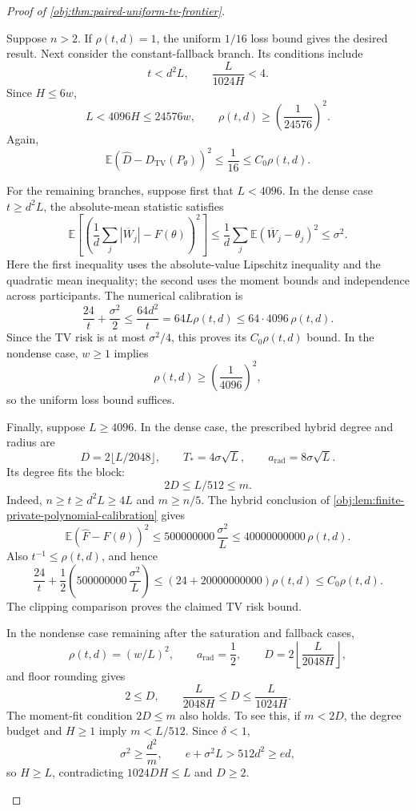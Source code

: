 \documentclass[11pt]{article}
\begin{document}
\begin{proof}[Proof of \cref{obj:thm:paired-uniform-tv-frontier}]
\begin{enumerate}
Suppose \(n>2\). If \(\rho(t,d)=1\), the uniform \(1/16\) loss bound gives the desired result.
Next consider the constant-fallback branch. Its conditions include
\[
t<d^2L,\qquad \frac{L}{1024H}<4.
\]
Since \(H\le6w\),
\[
L<4096H\le24576w,
\qquad
\rho(t,d)\ge\left(\frac1{24576}\right)^2.
\]
Again,
\[
\mathbb E(\widehat D-D_{\mathrm{TV}}(P_\theta))^2
\le\frac1{16}\le C_0\rho(t,d).
\]

For the remaining branches, suppose first that \(L<4096\).
In the dense case \(t\ge d^2L\), the absolute-mean statistic satisfies
\[
\mathbb E\left[
\left(\frac1d\sum_j|\overline W_j|-F(\theta)\right)^2
\right]
\le\frac1d\sum_j\mathbb E(\overline W_j-\theta_j)^2
\le\sigma^2.
\]
Here the first inequality uses the absolute-value Lipschitz inequality and the quadratic mean inequality; the second uses the moment bounds and independence across participants. The numerical calibration is
\[
\frac{24}{t}+\frac{\sigma^2}{2}
\le\frac{64d^2}{t}
=64L\rho(t,d)
\le64\cdot4096\,\rho(t,d).
\]
Since the TV risk is at most \(\sigma^2/4\), this proves its \(C_0\rho(t,d)\) bound.
In the nondense case, \(w\ge1\) implies
\[
\rho(t,d)\ge\left(\frac1{4096}\right)^2,
\]
so the uniform loss bound suffices.

Finally, suppose \(L\ge4096\).
In the dense case, the prescribed hybrid degree and radius are
\[
D=2\lfloor L/2048\rfloor,\qquad
T_*=4\sigma\sqrt L,\qquad a_{\mathrm{rad}}=8\sigma\sqrt L.
\]
Its degree fits the block:
\[
2D\le L/512\le m.
\]
Indeed, \(n\ge t\ge d^2L\ge4L\) and \(m\ge n/5\).
The hybrid conclusion of \cref{obj:lem:finite-private-polynomial-calibration} gives
\[
\mathbb E(\widehat F-F(\theta))^2
\le500000000\,\frac{\sigma^2}{L}
\le40000000000\,\rho(t,d).
\]
Also \(t^{-1}\le\rho(t,d)\), and hence
\[
\frac{24}{t}
+\frac12\left(500000000\,\frac{\sigma^2}{L}\right)
\le(24+20000000000)\rho(t,d)
\le C_0\rho(t,d).
\]
The clipping comparison proves the claimed TV risk bound.

In the nondense case remaining after the saturation and fallback cases,
\[
\rho(t,d)=(w/L)^2,\qquad
a_{\mathrm{rad}}=\frac12,\qquad
D=2\left\lfloor\frac{L}{2048H}\right\rfloor,
\]
and floor rounding gives
\[
2\le D,\qquad
\frac{L}{2048H}\le D\le\frac{L}{1024H}.
\]
The moment-fit condition \(2D\le m\) also holds. To see this, if \(m<2D\), the degree budget and \(H\ge1\) imply \(m<L/512\).
Since \(\delta<1\),
\[
\sigma^2\ge\frac{d^2}{m},
\qquad
e+\sigma^2L>512d^2\ge ed,
\]
so \(H\ge L\), contradicting \(1024DH\le L\) and \(D\ge2\).


\end{enumerate}
\end{proof}
\end{document}

